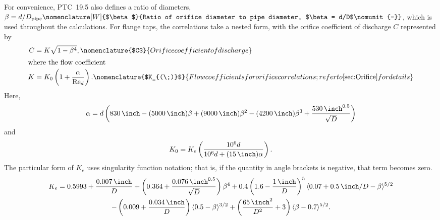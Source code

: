 For convenience, PTC~19.5 also defines a ratio of diameters, 
$\beta = {d}/{D_{\text{pipe}}}%
\nomenclature[W]{$\beta$}{Ratio of orifice diameter to pipe diameter, $\beta = d/D$\nomunit{-}}$,
which is used throughout the calculations.
For flange taps, the correlations take a nested form, with the orifice 
coefficient of discharge $C$ represented by
\begin{align}
C &= K\sqrt{1-\beta^4},
\nomenclature{$C$}{Orifice coefficient of discharge\nomunit{-}}\\
\shortintertext{where the flow coefficient}
K &= K_0 \left(1+\frac{\alpha}{\RE_d}\right).
\nomenclature{$K_{(\;)}$}{Flow coefficients for orifice correlations; refer to \cref{sec:Orifice} for details\nomunit{-}}
\end{align}
Here,
\begin{equation}
\alpha = d\left(\IP{830}{\per\inch} - (\IP{5000}{\per\inch})\beta + (\IP{9000}{\per\inch})\beta^2 - (\IP{4200}{\per\inch})\beta^3 + \frac{\IP{530}{\per\inch^{0.5}}}{\sqrt{D}}\right)
\end{equation}
and
\begin{equation}
K_0 = K_e \left(\frac{10^6 d}{10^6 d + (\IP{15}{\inch})\alpha}\right).
\end{equation}
The particular form of $K_e$ uses singularity function notation; that is,
if the quantity in angle brackets is negative, that term becomes zero.
\begin{multline}
K_e = 0.5993 + \frac{\IP{0.007}{\inch}}{D} + \left(0.364 + \frac{\IP{0.076}{\inch^{0.5}}}{\sqrt{D}}\right)\beta^4 
      + 0.4\left(1.6 - \frac{\IP{1}{\inch}}{D}\right)^5 \langle 0.07 + {\IP{0.5}{\inch}}/{D} - \beta\rangle^{5/2} \\
      - \left(0.009 + \frac{\IP{0.034}{\inch}}{D}\right) \langle0.5 - \beta\rangle^{3/2} 
      + \left(\frac{\IP{65}{\inch\squared}}{D^2} + 3\right)\langle\beta - 0.7\rangle^{5/2}.
\end{multline}


